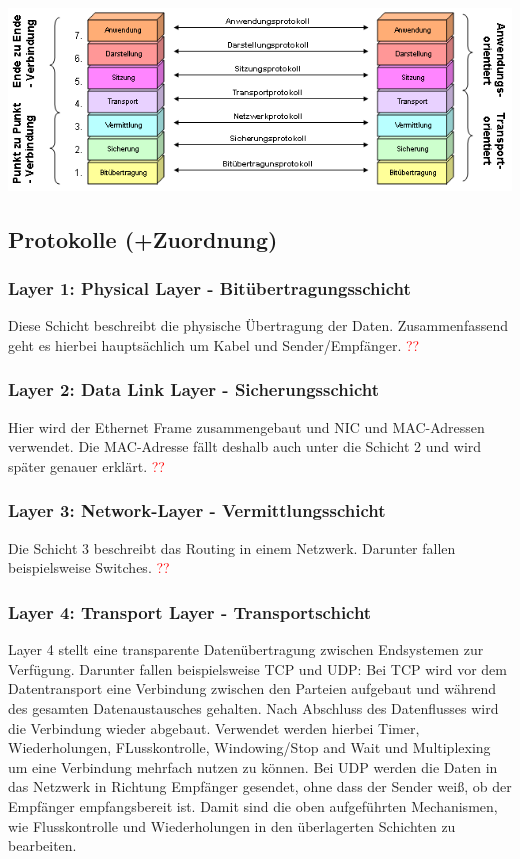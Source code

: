 \documentclass[12pt,a4paper]{article}
\begin{document}
			\includegraphics[scale=.75]{Bilder/OSI-Modell2} %

		\subsection{Protokolle (+Zuordnung)}
			\subsubsection{Layer 1: Physical Layer - Bitübertragungsschicht}
				Diese Schicht beschreibt die physische Übertragung der Daten. Zusammenfassend geht es hierbei hauptsächlich um Kabel und Sender/Empfänger. \textcolor{red}{??}

			\subsubsection{Layer 2: Data Link Layer - Sicherungsschicht}
				Hier wird der Ethernet Frame zusammengebaut und NIC und MAC-Adressen verwendet. Die MAC-Adresse fällt deshalb auch unter die Schicht 2 und wird später genauer erklärt. \textcolor{red}{??}

			\subsubsection{Layer 3: Network-Layer - Vermittlungsschicht}
				Die Schicht 3 beschreibt das Routing in einem Netzwerk. Darunter fallen beispielsweise Switches. \textcolor{red}{??}

			\subsubsection{Layer 4: Transport Layer - Transportschicht}
				Layer 4 stellt eine transparente Datenübertragung zwischen Endsystemen zur Verfügung. Darunter fallen beispielsweise TCP und UDP:\newline\newline
				Bei TCP wird vor dem Datentransport eine Verbindung zwischen den Parteien aufgebaut und während des gesamten Datenaustausches gehalten. Nach Abschluss des Datenflusses wird die Verbindung wieder abgebaut. Verwendet werden hierbei Timer, Wiederholungen, FLusskontrolle, Windowing/Stop and Wait und Multiplexing um eine Verbindung mehrfach nutzen zu können.\newline\newline
				Bei UDP werden die Daten in das Netzwerk in Richtung Empfänger gesendet, ohne dass der Sender weiß, ob der Empfänger empfangsbereit ist. Damit sind die oben aufgeführten Mechanismen, wie Flusskontrolle und Wiederholungen in den überlagerten Schichten zu bearbeiten.
\end{document}

